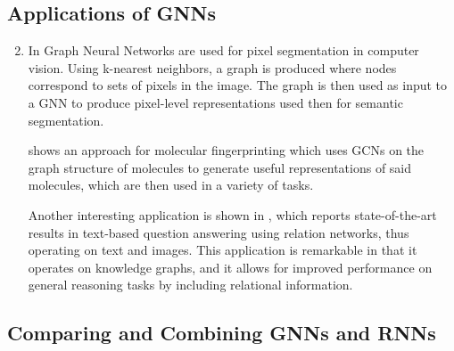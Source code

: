 \documentclass{article}
\begin{document}
\subsection{Applications of GNNs}

\begin{enumerate}[label=\textbf{3.\arabic*}]
  \setcounter{enumi}{1}
  \item
  In \cite{segmentation} Graph Neural Networks are used for pixel segmentation in computer vision. Using k-nearest neighbors, a graph is produced where nodes correspond to sets of pixels in the image. The graph is then used as input to a GNN to produce pixel-level representations used then for semantic segmentation.

  \cite{molecular} shows an approach for molecular fingerprinting which uses GCNs on the graph structure of molecules to generate useful representations of said molecules, which are then used in a variety of tasks.

  Another interesting application is shown in \cite{relational}, which reports state-of-the-art results in text-based question answering using relation networks, thus operating on text and images. This application is remarkable in that it operates on knowledge graphs, and it allows for improved performance on general reasoning tasks by including relational information.
\end{enumerate}

\subsection{Comparing and Combining GNNs and RNNs}
\end{document}
